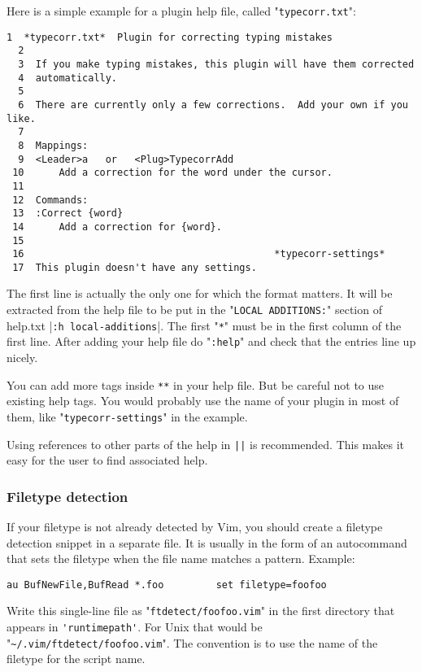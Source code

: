 Here is a simple example for a plugin help file, called "\verb!typecorr.txt!":

\begin{Verbatim}[samepage=true]
  1  *typecorr.txt*  Plugin for correcting typing mistakes
  2
  3  If you make typing mistakes, this plugin will have them corrected
  4  automatically.
  5
  6  There are currently only a few corrections.  Add your own if you like.
  7
  8  Mappings:
  9  <Leader>a   or   <Plug>TypecorrAdd
 10      Add a correction for the word under the cursor.
 11
 12  Commands:
 13  :Correct {word}
 14      Add a correction for {word}.
 15
 16                                           *typecorr-settings*
 17  This plugin doesn't have any settings.
\end{Verbatim}

The first line is actually the only one for which the format matters.
It will be extracted from the help file to be put in the "\verb!LOCAL ADDITIONS:!" section of help.txt |\verb!:h local-additions!|.
The first "\verb!*!" must be in the first column of the first line.
After adding your help file do "\verb!:help!" and check that the entries line up nicely.

You can add more tags inside \verb!**! in your help file.
But be careful not to use existing help tags.
You would probably use the name of your plugin in most of them, like "\verb!typecorr-settings!" in the example.

Using references to other parts of the help in \verb!||! is recommended.
This makes it easy for the user to find associated help.
\subsubsection{Filetype detection}
\label{plugin-filetype}
If your filetype is not already detected by Vim, you should create a filetype detection snippet in a separate file.
It is usually in the form of an autocommand that sets the filetype when the file name matches a pattern.
Example:

\begin{Verbatim}[samepage=true]
 au BufNewFile,BufRead *.foo         set filetype=foofoo
\end{Verbatim}

Write this single-line file as "\verb!ftdetect/foofoo.vim!" in the first directory that appears in \verb!'runtimepath'!.
For Unix that would be "\verb!~/.vim/ftdetect/foofoo.vim!".
The convention is to use the name of the filetype for the script name.


